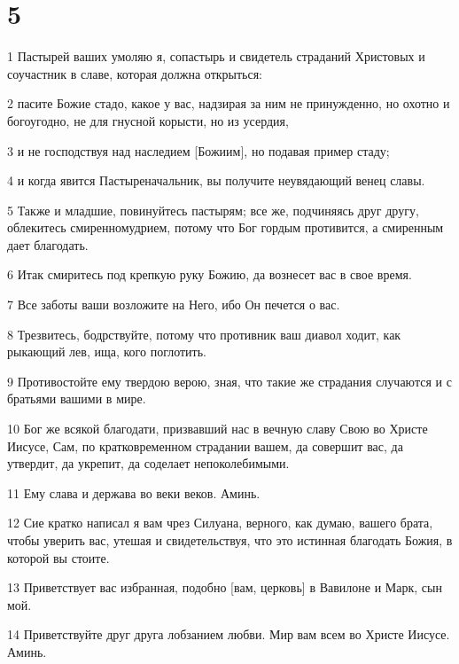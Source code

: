 \chapter{5}

\par 1 Пастырей ваших умоляю я, сопастырь и свидетель страданий Христовых и соучастник в славе, которая должна открыться:
\par 2 пасите Божие стадо, какое у вас, надзирая за ним не принужденно, но охотно и богоугодно, не для гнусной корысти, но из усердия,
\par 3 и не господствуя над наследием [Божиим], но подавая пример стаду;
\par 4 и когда явится Пастыреначальник, вы получите неувядающий венец славы.
\par 5 Также и младшие, повинуйтесь пастырям; все же, подчиняясь друг другу, облекитесь смиренномудрием, потому что Бог гордым противится, а смиренным дает благодать.
\par 6 Итак смиритесь под крепкую руку Божию, да вознесет вас в свое время.
\par 7 Все заботы ваши возложите на Него, ибо Он печется о вас.
\par 8 Трезвитесь, бодрствуйте, потому что противник ваш диавол ходит, как рыкающий лев, ища, кого поглотить.
\par 9 Противостойте ему твердою верою, зная, что такие же страдания случаются и с братьями вашими в мире.
\par 10 Бог же всякой благодати, призвавший нас в вечную славу Свою во Христе Иисусе, Сам, по кратковременном страдании вашем, да совершит вас, да утвердит, да укрепит, да соделает непоколебимыми.
\par 11 Ему слава и держава во веки веков. Аминь.
\par 12 Сие кратко написал я вам чрез Силуана, верного, как думаю, вашего брата, чтобы уверить вас, утешая и свидетельствуя, что это истинная благодать Божия, в которой вы стоите.
\par 13 Приветствует вас избранная, подобно [вам, церковь] в Вавилоне и Марк, сын мой.
\par 14 Приветствуйте друг друга лобзанием любви. Мир вам всем во Христе Иисусе. Аминь.


